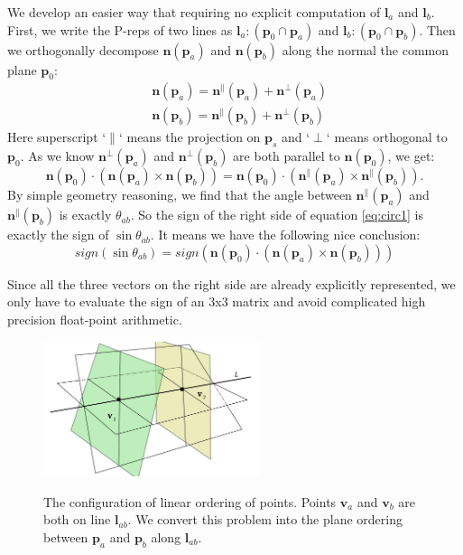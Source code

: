 \documentclass[10pt,journal,compsoc]{IEEEtran}
\begin{document}
We develop an easier way that requiring no explicit computation of $\bm{l}_a$ and $\bm{l}_b$. First, we write the P-reps of two lines as $\bm{l}_a\colon(\bm{p}_0\cap\bm{p}_a)$ and $\bm{l}_b\colon(\bm{p}_0\cap\bm{p}_b)$. Then we orthogonally decompose $\bm{n}(\bm{p}_a)$ and $\bm{n}(\bm{p}_b)$ along the normal the common plane $\bm{p}_0$:
\begin{equation}
\begin{split}
&\bm{n}(\bm{p}_a)= \bm{n}^\parallel(\bm{p}_a) + \bm{n}^\perp(\bm{p}_a)\\
&\bm{n}(\bm{p}_b)= \bm{n}^\parallel(\bm{p}_b) + \bm{n}^\perp(\bm{p}_b)
\end{split}
\end{equation}
Here superscript `$\parallel$` means the projection on $\bm{p}_s$ and `$\perp$` means orthogonal to $\bm{p}_0$. As we know $\bm{n}^\perp(\bm{p}_a)$ and $\bm{n}^\perp(\bm{p}_b)$ are both parallel to $\bm{n}(\bm{p}_0)$, we get:
\begin{equation}
\label{eq:circ1}
\bm{n}(\bm{p}_0) \cdot (\bm{n}(\bm{p}_a) \times \bm{n}(\bm{p}_b)) = \bm{n}(\bm{p}_0) \cdot (\bm{n}^\parallel(\bm{p}_a) \times \bm{n}^\parallel(\bm{p}_b)).
\end{equation}
By simple geometry reasoning, we find that the angle between $\bm{n}^\parallel(\bm{p}_a)$ and $\bm{n}^\parallel(\bm{p}_b)$ is exactly $\theta_{ab}$. So the sign of the right side of equation \ref{eq:circ1} is exactly the sign of $\sin{\theta_{ab}}$. It means we have the following nice conclusion:
\begin{equation}
\label{eq:circ2}
sign(\sin{\theta_{ab}})=  sign(\bm{n}(\bm{p}_0)\cdot(\bm{n}(\bm{p}_a) \times \bm{n}(\bm{p}_b)))
\end{equation}

Since all the three vectors on the right side are already explicitly represented, we only have to evaluate the sign of an 3x3 matrix and avoid complicated high precision float-point arithmetic.
\begin{figure}
  \centering
  \includegraphics[width=2.5in]{twopointoneline}\\
  \caption{The configuration of linear ordering of points. Points $\bm{v}_a$ and $\bm{v}_b$ are both on line $\bm{l}_{ab}$. We convert this problem into the plane ordering between $\bm{p}_a$ and $\bm{p}_b$ along $\bm{l}_{ab}$.}\label{fig:twopointoneline}
\end{figure}
\end{document}

